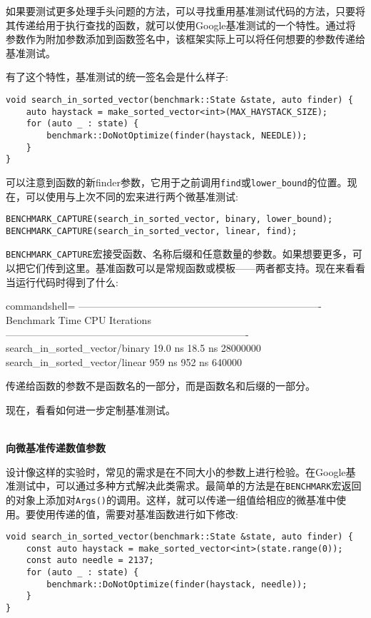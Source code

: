 如果要测试更多处理手头问题的方法，可以寻找重用基准测试代码的方法，只要将其传递给用于执行查找的函数，就可以使用Google基准测试的一个特性。通过将参数作为附加参数添加到函数签名中，该框架实际上可以将任何想要的参数传递给基准测试。

有了这个特性，基准测试的统一签名会是什么样子:

\begin{lstlisting}[style=styleCXX]
void search_in_sorted_vector(benchmark::State &state, auto finder) {
	auto haystack = make_sorted_vector<int>(MAX_HAYSTACK_SIZE);
	for (auto _ : state) {
		benchmark::DoNotOptimize(finder(haystack, NEEDLE));
	}
}
\end{lstlisting}

可以注意到函数的新finder参数，它用于之前调用\texttt{find}或\texttt{lower\_bound}的位置。现在，可以使用与上次不同的宏来进行两个微基准测试:

\begin{lstlisting}[style=styleCXX]
BENCHMARK_CAPTURE(search_in_sorted_vector, binary, lower_bound);
BENCHMARK_CAPTURE(search_in_sorted_vector, linear, find);
\end{lstlisting}

\texttt{BENCHMARK\_CAPTURE}宏接受函数、名称后缀和任意数量的参数。如果想要更多，可以把它们传到这里。基准函数可以是常规函数或模板——两者都支持。现在来看看当运行代码时得到了什么:

\begin{tcblisting}{commandshell={}}
-------------------------------------------------------------------------
Benchmark Time CPU Iterations
-------------------------------------------------------------------------
search_in_sorted_vector/binary 19.0 ns 18.5 ns 28000000
search_in_sorted_vector/linear 959 ns 952 ns 640000
\end{tcblisting}

传递给函数的参数不是函数名的一部分，而是函数名和后缀的一部分。

现在，看看如何进一步定制基准测试。

\hspace*{\fill} \\ %
\noindent
\textbf{向微基准传递数值参数}

设计像这样的实验时，常见的需求是在不同大小的参数上进行检验。在Google基准测试中，可以通过多种方式解决此类需求。最简单的方法是在\texttt{BENCHMARK}宏返回的对象上添加对\texttt{Args()}的调用。这样，就可以传递一组值给相应的微基准中使用。要使用传递的值，需要对基准函数进行如下修改:

\begin{lstlisting}[style=styleCXX]
void search_in_sorted_vector(benchmark::State &state, auto finder) {
	const auto haystack = make_sorted_vector<int>(state.range(0));
	const auto needle = 2137;
	for (auto _ : state) {
		benchmark::DoNotOptimize(finder(haystack, needle));
	}
}
\end{lstlisting}

